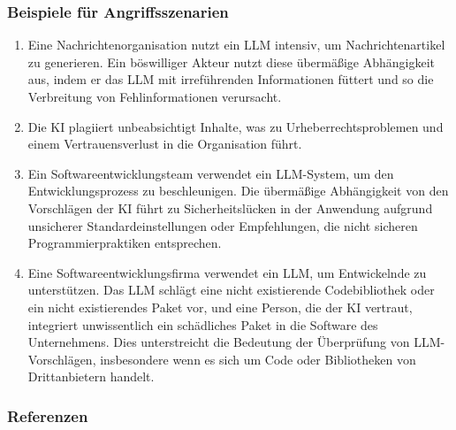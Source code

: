 \documentclass[
]{article}
\providecommand{\tightlist}{%
  \setlength{\itemsep}{0pt}\setlength{\parskip}{0pt}}
\begin{document}
\subsubsection{Beispiele für
Angriffsszenarien}\label{beispiele-fuxfcr-angriffsszenarien}

\begin{enumerate}
\def\labelenumi{\arabic{enumi}.}
\tightlist
\item
  Eine Nachrichtenorganisation nutzt ein LLM intensiv, um
  Nachrichtenartikel zu generieren. Ein böswilliger Akteur nutzt diese
  übermäßige Abhängigkeit aus, indem er das LLM mit irreführenden
  Informationen füttert und so die Verbreitung von Fehlinformationen
  verursacht.
\item
  Die KI plagiiert unbeabsichtigt Inhalte, was zu Urheberrechtsproblemen
  und einem Vertrauensverlust in die Organisation führt.
\item
  Ein Softwareentwicklungsteam verwendet ein LLM-System, um den
  Entwicklungsprozess zu beschleunigen. Die übermäßige Abhängigkeit von
  den Vorschlägen der KI führt zu Sicherheitslücken in der Anwendung
  aufgrund unsicherer Standardeinstellungen oder Empfehlungen, die nicht
  sicheren Programmierpraktiken entsprechen.
\item
  Eine Softwareentwicklungsfirma verwendet ein LLM, um Entwickelnde zu
  unterstützen. Das LLM schlägt eine nicht existierende Codebibliothek
  oder ein nicht existierendes Paket vor, und eine Person, die der KI
  vertraut, integriert unwissentlich ein schädliches Paket in die
  Software des Unternehmens. Dies unterstreicht die Bedeutung der
  Überprüfung von LLM-Vorschlägen, insbesondere wenn es sich um Code
  oder Bibliotheken von Drittanbietern handelt.
\end{enumerate}

\subsubsection{Referenzen}\label{referenzen}
\end{document}

